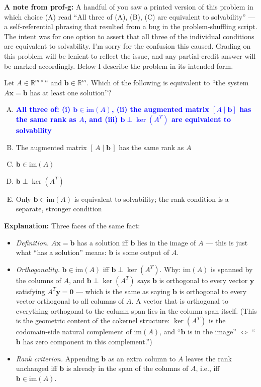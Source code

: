 \documentclass[12pt]{amsart}
\begin{document}
\textbf{A note from prof-g:} A handful of you saw a printed version of this
problem in which choice (A) read ``All three of (A), (B), (C) are equivalent
to solvability'' --- a self-referential phrasing that resulted from a bug in
the problem-shuffling script. The intent was for one option to assert that
all three of the individual conditions are equivalent to solvability. I'm
sorry for the confusion this caused. Grading on this problem will be lenient
to reflect the issue, and any partial-credit answer will be marked accordingly.
Below I describe the problem in its intended form.

Let $A \in \mathbb{R}^{m \times n}$ and $\mathbf{b} \in \mathbb{R}^m$. Which
of the following is equivalent to ``the system $A\mathbf{x} = \mathbf{b}$ has
at least one solution''?

\begin{enumerate}[(A)]
\item \textcolor{blue}{\textbf{All three of: (i) $\mathbf{b} \in \mathrm{im}(A)$, (ii) the augmented matrix $[A \mid \mathbf{b}]$ has the same rank as $A$, and (iii) $\mathbf{b} \perp \ker(A^T)$ are equivalent to solvability}}
\item The augmented matrix $[\,A \mid \mathbf{b}\,]$ has the same rank as $A$
\item $\mathbf{b} \in \mathrm{im}(A)$
\item $\mathbf{b} \perp \ker(A^T)$
\item Only $\mathbf{b} \in \mathrm{im}(A)$ is equivalent to solvability; the rank condition is a separate, stronger condition
\end{enumerate}

\textbf{Explanation:}
Three faces of the same fact:
\begin{itemize}
\item \emph{Definition.} $A\mathbf{x} = \mathbf{b}$ has a solution iff $\mathbf{b}$ lies in the image of $A$ --- this is just what ``has a solution'' means: $\mathbf{b}$ is some output of $A$.
\item \emph{Orthogonality.} $\mathbf{b} \in \mathrm{im}(A)$ iff $\mathbf{b} \perp \ker(A^T)$. Why: $\mathrm{im}(A)$ is spanned by the columns of $A$, and $\mathbf{b} \perp \ker(A^T)$ says $\mathbf{b}$ is orthogonal to every vector $\mathbf{y}$ satisfying $A^T \mathbf{y} = \mathbf{0}$ --- which is the same as saying $\mathbf{b}$ is orthogonal to every vector orthogonal to all columns of $A$. A vector that is orthogonal to everything orthogonal to the column span lies in the column span itself. (This is the geometric content of the cokernel structure: $\ker(A^T)$ is the codomain-side natural complement of $\mathrm{im}(A)$, and ``$\mathbf{b}$ is in the image'' $\Leftrightarrow$ ``$\mathbf{b}$ has zero component in this complement.'')
\item \emph{Rank criterion.} Appending $\mathbf{b}$ as an extra column to $A$ leaves the rank unchanged iff $\mathbf{b}$ is already in the span of the columns of $A$, i.e., iff $\mathbf{b} \in \mathrm{im}(A)$.
\end{itemize}
\end{document}
